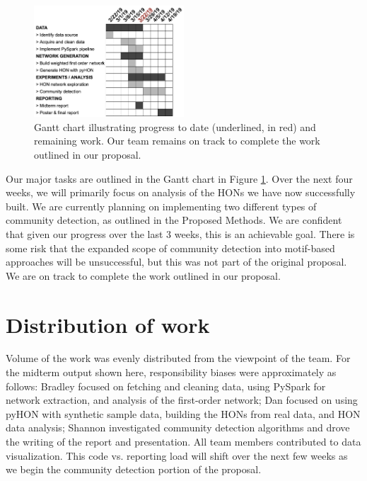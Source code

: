 \documentclass[sigconf]{acmart}
\begin{document}
\begin{figure}[t]
    \centering
    \includegraphics[width=0.5\textwidth]{gantt.png}
    \caption{Gantt chart illustrating progress to date (underlined, in red) and remaining work. Our team remains on track to complete the work outlined in our proposal.}
    \label{fig:gantt}
\end{figure}

Our major tasks are outlined in the Gantt chart in Figure \ref{fig:gantt}. Over the next four weeks, we will primarily focus on analysis of the HONs we have now successfully built. We are currently planning on implementing two different types of community detection, as outlined in the Proposed Methods. We are confident that given our progress over the last 3 weeks, this is an achievable goal. There is some risk that the expanded scope of community detection into motif-based approaches will be unsuccessful, but this was not part of the original proposal. We are on track to complete the work outlined in our proposal.

\section{Distribution of work}
Volume of the work was evenly distributed from the viewpoint of the team. For the midterm output shown here, responsibility biases were approximately as follows: Bradley focused on fetching and cleaning data, using PySpark for network extraction, and analysis of the first-order network; Dan focused on using pyHON with synthetic sample data, building the HONs from real data, and HON data analysis; Shannon investigated community detection algorithms and drove the writing of the report and presentation. All team members contributed to data visualization. This code vs. reporting load will shift over the next few weeks as we begin the community detection portion of the proposal.

\newpage



\appendix
\end{document}
